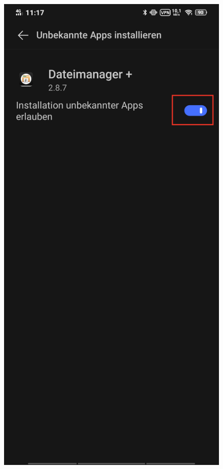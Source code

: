 \documentclass{article}
\begin{document}
\begin{enumerate}
\begin{minipage}{0.5\textwidth}
        \end{minipage}
        \begin{minipage}{0.5\textwidth}
        \begin{figure}[H]
            \includegraphics[scale=0.56]{17.jpg}
            \centering
        \end{figure}
        \end{minipage}
        

\end{enumerate}
\end{document}
